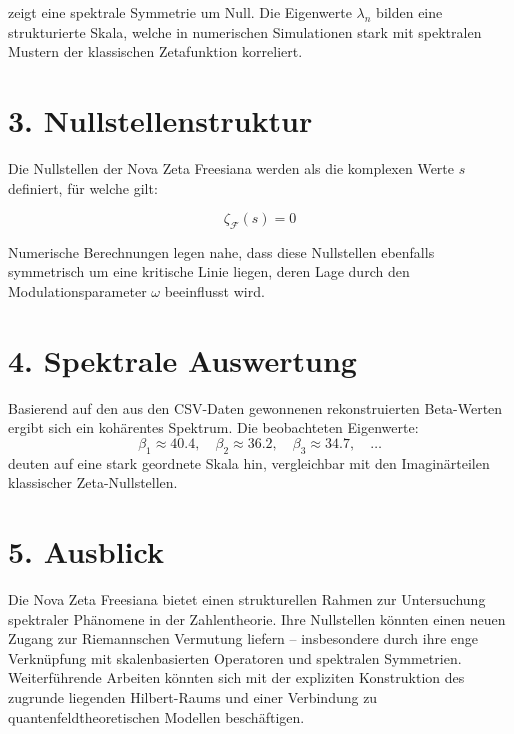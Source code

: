 \documentclass[11pt,a4paper]{article}
\begin{document}
zeigt eine spektrale Symmetrie um Null. Die Eigenwerte $\lambda_n$ bilden eine strukturierte Skala, welche in numerischen Simulationen stark mit spektralen Mustern der klassischen Zetafunktion korreliert.

\section*{3. Nullstellenstruktur}

Die Nullstellen der Nova Zeta Freesiana werden als die komplexen Werte $s$ definiert, für welche gilt:

\[
\zeta_{\mathcal{F}}(s) = 0
\]

Numerische Berechnungen legen nahe, dass diese Nullstellen ebenfalls symmetrisch um eine kritische Linie liegen, deren Lage durch den Modulationsparameter $\omega$ beeinflusst wird.

\section*{4. Spektrale Auswertung}

Basierend auf den aus den CSV-Daten gewonnenen rekonstruierten Beta-Werten ergibt sich ein kohärentes Spektrum. Die beobachteten Eigenwerte:
\[
\beta_1 \approx 40.4,\quad \beta_2 \approx 36.2,\quad \beta_3 \approx 34.7,\quad \dots
\]
deuten auf eine stark geordnete Skala hin, vergleichbar mit den Imaginärteilen klassischer Zeta-Nullstellen.

\section*{5. Ausblick}

Die Nova Zeta Freesiana bietet einen strukturellen Rahmen zur Untersuchung spektraler Phänomene in der Zahlentheorie. Ihre Nullstellen könnten einen neuen Zugang zur Riemannschen Vermutung liefern – insbesondere durch ihre enge Verknüpfung mit skalenbasierten Operatoren und spektralen Symmetrien. Weiterführende Arbeiten könnten sich mit der expliziten Konstruktion des zugrunde liegenden Hilbert-Raums und einer Verbindung zu quantenfeldtheoretischen Modellen beschäftigen.
\end{document}
